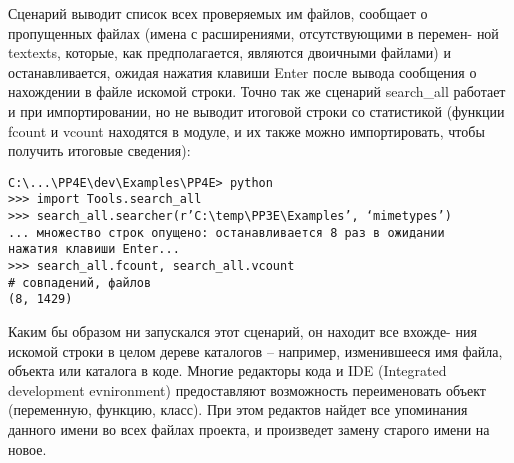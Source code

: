 \documentclass[12pt]{article}
\begin{document}
Сценарий выводит список всех проверяемых им файлов, сообщает о пропущенных файлах (имена с расширениями, отсутствующими в перемен-
ной textexts, которые, как предполагается, являются двоичными файлами) и останавливается, ожидая нажатия клавиши Enter после вывода
сообщения о нахождении в файле искомой строки. Точно так же сценарий search\_all работает и при импортировании, но не выводит итоговой
строки со статистикой (функции fcount и vcount находятся в модуле, и их
также можно импортировать, чтобы получить итоговые сведения):
\begin{verbatim}
C:\...\PP4E\dev\Examples\PP4E> python
>>> import Tools.search_all
>>> search_all.searcher(r’C:\temp\PP3E\Examples’, ‘mimetypes’)
... множество строк опущено: останавливается 8 раз в ожидании
нажатия клавиши Enter...
>>> search_all.fcount, search_all.vcount
# совпадений, файлов
(8, 1429)
\end{verbatim}
Каким бы образом ни запускался этот сценарий, он находит все вхожде-
ния искомой строки в целом дереве каталогов – например, изменившееся
имя файла, объекта или каталога в коде. Многие редакторы кода и IDE (Integrated development evnironment) предоставляют возможность переименовать объект (переменную, функцию, класс). При этом редактов найдет все упоминания данного имени во всех файлах проекта, и произведет замену старого имени на новое. 
\end{document}
